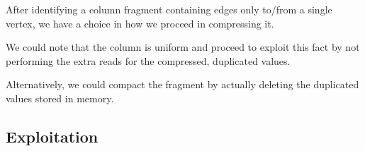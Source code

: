 After identifying a column fragment containing edges only to/from a single vertex, we have a choice 
in how we proceed in compressing it.

We could note that the column is uniform and proceed to exploit this fact by not performing the extra 
reads for the compressed, duplicated values.

Alternatively, we could compact the fragment by actually deleting the duplicated values stored in 
memory.

\subsection{Exploitation}
\label{ss:compressionexploitation}
